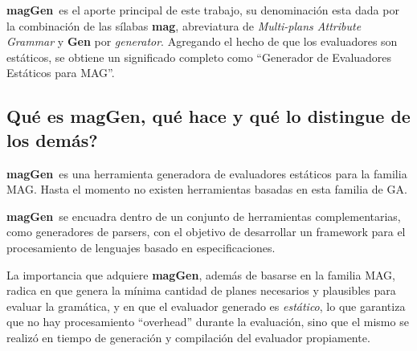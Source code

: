 \documentclass[runningheads,a4paper]{llncs}
\newcommand{\maggen}{\textbf{magGen}}
\begin{document}

\maggen\ es el aporte principal de este trabajo, su denominación esta dada por la combinación de las sílabas \textbf{mag}, abreviatura de \textit{Multi-plans Attribute Grammar} y \textbf{Gen} por \textit{generator}. Agregando el hecho de que los evaluadores son estáticos, se obtiene un significado completo como ``Generador de Evaluadores Estáticos para MAG''.

\subsection{\textquestiondown Qué es \maggen, qué hace y qué lo distingue de los demás?}
\maggen\ es una herramienta generadora de evaluadores estáticos para la familia MAG. Hasta el momento no existen herramientas basadas en esta familia de GA. 

\maggen\ se encuadra dentro de un conjunto de herramientas complementarias, como generadores de parsers, con el objetivo de desarrollar un framework para el procesamiento de lenguajes basado en especificaciones.

La importancia que adquiere \maggen, además de basarse en la familia MAG, radica en que genera la mínima cantidad de planes necesarios y plausibles para evaluar la gramática, y en que el evaluador generado es \textit{estático}, lo que garantiza que no hay procesamiento ``overhead'' durante la evaluación, sino que el mismo se realizó en tiempo de generación y compilación del evaluador propiamente.

%  

\end{document}
